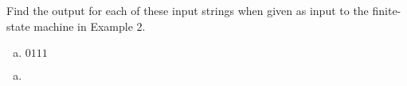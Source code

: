 \documentclass[../main.tex]{subfiles}
\begin{document}
Find the output for each of these input strings when given as input to the finite-state machine in Example 2.
\begin{enumerate}[a)]
	\item $0111$
\end{enumerate}

\solution
\begin{enumerate}[a)]
	\item 
\end{enumerate}
\end{document}
